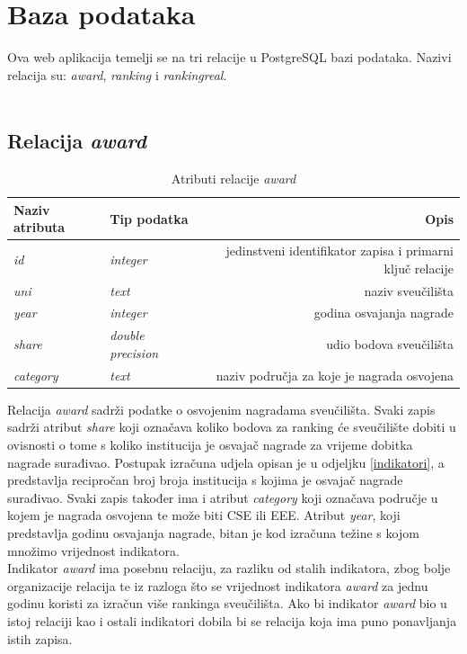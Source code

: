 \documentclass[times, utf8, zavrsni]{fer}
\begin{document}
\section{Baza podataka}
Ova web aplikacija temelji se na tri relacije u PostgreSQL bazi podataka. Nazivi relacija su: \emph{award}, \emph{ranking} i \emph{rankingreal}.
\\\\\subsection{Relacija \emph{award}}
\begin{table}[htb]
    \caption{Atributi relacije \emph{award}}
        \label{tbl:award}
        \centering
        \begin{tabular}{llr} \hline
        Naziv atributa & Tip podatka & Opis\\ \hline
        \emph{id} &  \emph{integer} & jedinstveni identifikator zapisa i primarni ključ relacije\\
        \emph{uni} &  \emph{text} & naziv sveučilišta\\
        \emph{year} &  \emph{integer} & godina osvajanja nagrade\\
        \emph{share} &  \emph{double precision} & udio bodova sveučilišta\\
        \emph{category} &  \emph{text} & naziv područja za koje je nagrada osvojena\\
        \end{tabular}
        \end{table}    
        \FloatBarrier 
Relacija \emph{award} sadrži podatke o osvojenim nagradama sveučilišta. Svaki zapis sadrži atribut \emph{share} koji označava 
koliko bodova za ranking će sveučilište dobiti u ovisnosti o tome s koliko institucija je osvajač nagrade za vrijeme dobitka nagrade
surađivao. Postupak izračuna udjela opisan je u odjeljku \ref{indikatori}, a predstavlja recipročan broj broja institucija s kojima je osvajač 
nagrade surađivao. Svaki zapis također ima i atribut \emph{category} koji označava područje u kojem je nagrada osvojena te može biti CSE ili EEE.
Atribut \emph{year}, koji predstavlja godinu osvajanja nagrade, bitan je kod izračuna težine s kojom množimo vrijednost indikatora.
\\Indikator \emph{award} ima posebnu relaciju, za razliku od stalih indikatora, zbog bolje organizacije relacija te iz razloga što se 
vrijednost indikatora \emph{award} za jednu godinu koristi za izračun više rankinga sveučilišta. Ako bi indikator \emph{award} bio u istoj relaciji
kao i ostali indikatori dobila bi se relacija koja ima puno ponavljanja istih zapisa.
\end{document}
